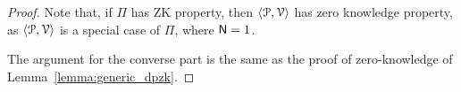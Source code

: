 \begin{proof}
	Note that, if $\Pi$ has ZK property, then $\langle \mathcal{P},\mathcal{V}\rangle$ has zero knowledge property, as $\langle \mathcal{P},\mathcal{V}\rangle$ is a special case of $\Pi$, where $\mathsf{N}=1$. 
	
	The argument for the converse part is the same as the proof of zero-knowledge of Lemma~\ref{lemma:generic_dpzk}.
%	
%	
%	
%	
\end{proof}
